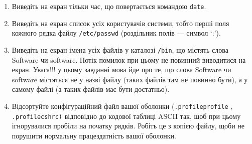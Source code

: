 \documentclass{article}
\begin{document}
\begin{enumerate}
		\item Виведіть на екран тільки час, що повертається командою \texttt{date}.
		
		\item Виведіть на екран список усіх користувачів системи, тобто перші поля
		кожного рядка файлу \texttt{/etc/passwd} (роздільник полів — символ ‘:’).
		
		\item Виведіть на екран імена усіх файлів у каталозі \texttt{/bin}, що містять слова
		Software чи software. Потік помилок при цьому не повинний
		виводитися на екран.
		Увага!!! у цьому завданні мова йде про те, що слова Software чи
		software містяться не у назві файлу (таких файлів там не повинно
		бути), а у самому файлі (а таких файлів має бути достатньо).
		
		\item Відсортуйте конфігураційний файл вашої оболонки (\texttt{.profileprofile} ,
\\
		\texttt{.profilecshrc)} відповідно до кодової таблиці ASCII так, щоб при цьому
		ігнорувалися пробіли на початку рядків. Робіть це з копією файлу,
		щоби не порушити нормальну працездатність вашої оболонки.
		
	\end{enumerate}
	\newpage
\end{document}
